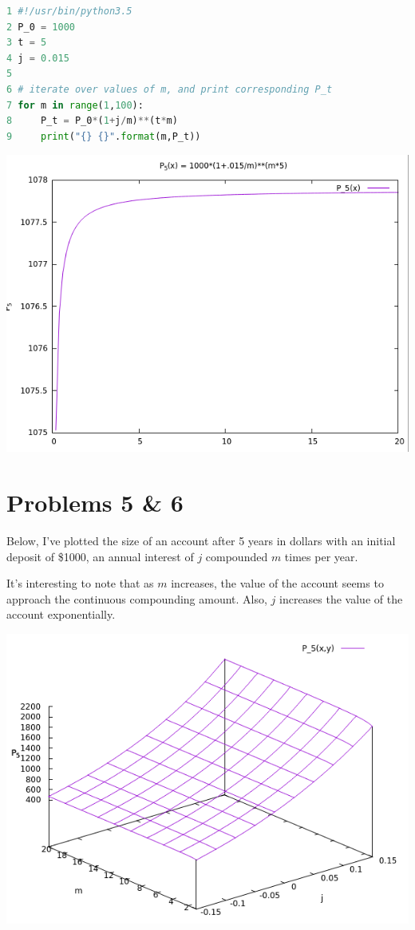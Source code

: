 \documentclass[12pt]{article}
\begin{document}
\begin{lstlisting}[language=python, caption=$P_t$ at different values of $m$]
1 #!/usr/bin/python3.5
2 P_0 = 1000
3 t = 5
4 j = 0.015
5 
6 # iterate over values of m, and print corresponding P_t
7 for m in range(1,100):
8     P_t = P_0*(1+j/m)**(t*m)
9     print("{} {}".format(m,P_t))
\end{lstlisting}

\begin{center}
\includegraphics[scale=0.5]{screenshot1.png}
\end{center}

\section*{Problems 5 \& 6}
Below, I've plotted the size of an account after 5 years in dollars with an initial
 deposit of \$1000, an annual interest of $j$ compounded $m$ times per year.
 
 It's interesting to note that as $m$ increases, the value of the account seems to 
 approach the continuous compounding amount. Also, $j$ increases the value of the account
 exponentially.
 
\begin{center}
	\includegraphics[scale=0.5]{screenshot2.png}
\end{center}
\end{document}
